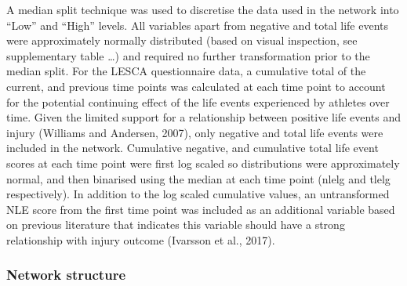 \documentclass[utf8]{frontiersHLTH}
\begin{document}
A median split technique was used to discretise the data used in the
network into ``Low'' and ``High'' levels. All variables apart from
negative and total life events were approximately normally distributed
(based on visual inspection, see supplementary table \ldots) and
required no further transformation prior to the median split. For the
LESCA questionnaire data, a cumulative total of the current, and
previous time points was calculated at each time point to account for
the potential continuing effect of the life events experienced by
athletes over time. Given the limited support for a relationship between
positive life events and injury (Williams and Andersen, 2007), only
negative and total life events were included in the network. Cumulative
negative, and cumulative total life event scores at each time point were
first log scaled so distributions were approximately normal, and then
binarised using the median at each time point (nlelg and tlelg
respectively). In addition to the log scaled cumulative values, an
untransformed NLE score from the first time point was included as an
additional variable based on previous literature that indicates this
variable should have a strong relationship with injury outcome (Ivarsson
et al., 2017).

\hypertarget{network-structure}{%
\subsubsection*{Network structure}\label{network-structure}}
\end{document}
